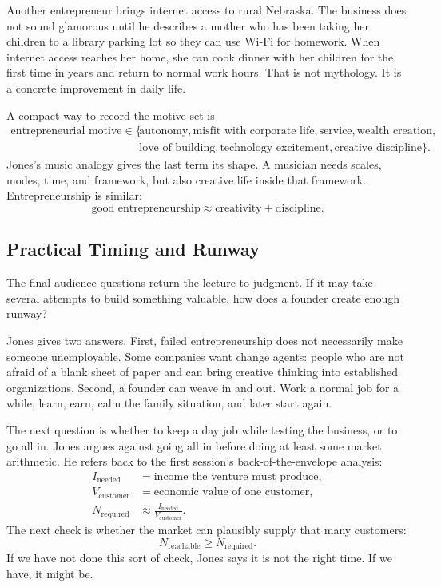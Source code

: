 Another entrepreneur brings internet access to rural Nebraska. The business does not sound glamorous until he describes a mother who has been taking her children to a library parking lot so they can use Wi-Fi for homework. When internet access reaches her home, she can cook dinner with her children for the first time in years and return to normal work hours. That is not mythology. It is a concrete improvement in daily life.

A compact way to record the motive set is
\begin{align}
\text{entrepreneurial motive}\in
\{&
\text{autonomy},
\text{misfit with corporate life},
\text{service},
\text{wealth creation},\\
&
\text{love of building},
\text{technology excitement},
\text{creative discipline}
\}.
\end{align}
Jones's music analogy gives the last term its shape. A musician needs scales, modes, time, and framework, but also creative life inside that framework. Entrepreneurship is similar:
\begin{equation}
\text{good entrepreneurship}
\approx
\text{creativity}+\text{discipline}.
\end{equation}

\subsection{Practical Timing and Runway}

The final audience questions return the lecture to judgment. If it may take several attempts to build something valuable, how does a founder create enough runway?

Jones gives two answers. First, failed entrepreneurship does not necessarily make someone unemployable. Some companies want change agents: people who are not afraid of a blank sheet of paper and can bring creative thinking into established organizations. Second, a founder can weave in and out. Work a normal job for a while, learn, earn, calm the family situation, and later start again.

The next question is whether to keep a day job while testing the business, or to go all in. Jones argues against going all in before doing at least some market arithmetic. He refers back to the first session's back-of-the-envelope analysis:
\begin{align}
I_{\text{needed}}&=\text{income the venture must produce},\\
V_{\text{customer}}&=\text{economic value of one customer},\\
N_{\text{required}}&\approx \frac{I_{\text{needed}}}{V_{\text{customer}}}.
\end{align}
The next check is whether the market can plausibly supply that many customers:
\begin{equation}
N_{\text{reachable}}\geq N_{\text{required}}.
\end{equation}
If we have not done this sort of check, Jones says it is not the right time. If we have, it might be.

